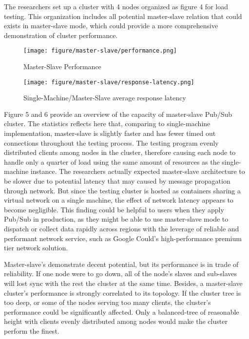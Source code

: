 The researchers set up a cluster with 4 nodes organized as figure 4 for load testing. This organization includes all potential master-slave relation that could exists in master-slave mode, which could provide a more comprehensive demonstration of cluster performance.
	
\begin{figure}[H]
	\centering
	\texttt{[image: figure/master-slave/performance.png]}
	\caption{Master-Slave Performance}
\end{figure}

\begin{figure}[H]
	\centering
	\texttt{[image: figure/master-slave/response-latency.png]}
	\caption{Single-Machine/Master-Slave average response latency}
\end{figure}

Figure 5 and 6 provide an overview of the capacity of master-slave Pub/Sub cluster. The statistics reflects here that, comparing to single-machine implementation, master-slave is slightly faster and has fewer timed out connections throughout the testing process. The testing program evenly distributed clients among nodes in the cluster, therefore causing each node  to handle only a quarter of load using the same amount of resources as the single-machine instance. The researchers actually expected master-slave architecture to be slower due to potential latency that may caused by message propagation through network. But since the testing cluster is hosted as containers sharing a virtual network on a single machine, the effect of network latency appears to become negligible. This finding could be helpful to users when they apply Pub/Sub in production, as they might be able to use master-slave mode to dispatch or collect data rapidly across regions with the leverage of reliable and performant network service, such as Google Could's high-performance premium tier network solution\citep{google-cloud-network}.

Master-slave's demonstrate decent potential, but its performance is in trade of reliability. If one node were to go down, all of the node's slaves and sub-slaves will lost sync with the rest the cluster at the same time. Besides, a master-slave cluster's performance is strongly correlated to its topology. If the cluster tree is too deep, or some of the nodes serving too many clients, the cluster's performance could be significantly affected. Only a balanced-tree of reasonable height with clients evenly distributed among nodes would make the cluster perform the finest. 
\